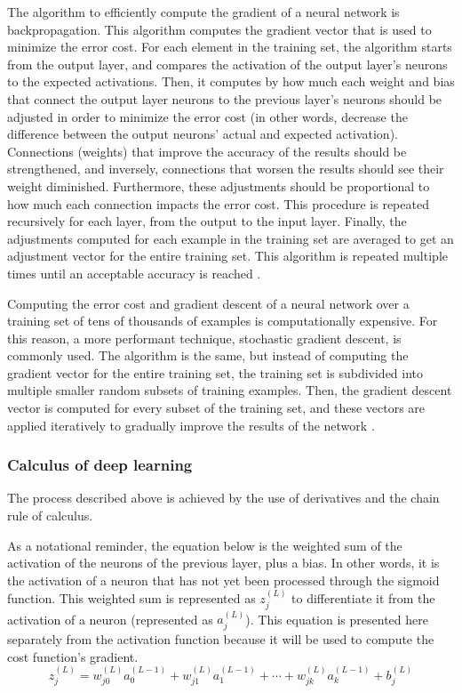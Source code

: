 \documentclass[12pt,a4paper,notitlepage]{article}
\begin{document}
The algorithm to efficiently compute the gradient of a neural network is backpropagation. This algorithm computes the gradient vector that is used to minimize the error cost. For each element in the training set, the algorithm starts from the output layer, and compares the activation of the output layer's neurons to the expected activations. Then, it computes by how much each weight and bias that connect the output layer neurons to the previous layer's neurons should be adjusted in order to minimize the error cost (in other words, decrease the difference between the output neurons' actual and expected activation). Connections (weights) that improve the accuracy of the results should be strengthened, and inversely, connections that worsen the results should see their weight diminished. Furthermore, these adjustments should be proportional to how much each connection impacts the error cost. This procedure is repeated recursively for each layer, from the output to the input layer. Finally, the adjustments computed for each example in the training set are averaged to get an adjustment vector for the entire training set. This algorithm is repeated multiple times until an acceptable accuracy is reached \cite{sanderson_gradient_2017}.

Computing the error cost and gradient descent of a neural network over a training set of tens of thousands of examples is computationally expensive. For this reason, a more performant technique, stochastic gradient descent, is commonly used. The algorithm is the same, but instead of computing the gradient vector for the entire training set, the training set is subdivided into multiple smaller random subsets of training examples. Then, the gradient descent vector is computed for every subset of the training set, and these vectors are applied iteratively to gradually improve the results of the network \cite{sanderson_gradient_2017}.

\subsubsection{Calculus of deep learning}
The process described above is achieved by the use of derivatives and the chain rule of calculus.

As a notational reminder, the equation below is the weighted sum of the activation of the neurons of the previous layer, plus a bias. In other words, it is the activation of a neuron that has not yet been processed through the sigmoid function. This weighted sum is represented as \(z_j^{(L)}\) to differentiate it from the activation of a neuron (represented as \(a_j^{(L)}\)). This equation is presented here separately from the activation function because it will be used to compute the cost function's gradient.
\begin{displaymath}
	z_j^{(L)} = w_{j0}^{(L)}a_0^{(L-1)} + w_{j1}^{(L)}a_1^{(L-1)} + \cdots + w_{jk}^{(L)}a_k^{(L-1)} + b_j^{(L)}
\end{displaymath}
\end{document}
